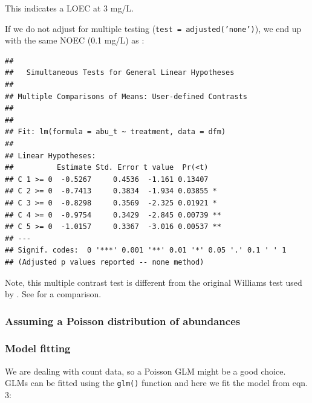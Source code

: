 This indicates a LOEC at 3 mg/L.

If we do not adjust for multiple testing (\texttt{test = adjusted('none')}), we end up with the same NOEC  (0.1 mg/L) as \citet{brock_minimum_2015}:
\begin{knitrout}
\color{fgcolor}\small\begin{kframe}
\begin{alltt}
\hlstd{(}  \hlstd{=} \hlstd{(} 
                 \hlstd{=} \hlstd{),}
                 \hlstd{=} \hlstd{(}\hlstd{))}
\end{alltt}
\begin{verbatim}
## 
## 	 Simultaneous Tests for General Linear Hypotheses
## 
## Multiple Comparisons of Means: User-defined Contrasts
## 
## 
## Fit: lm(formula = abu_t ~ treatment, data = dfm)
## 
## Linear Hypotheses:
##          Estimate Std. Error t value  Pr(<t)   
## C 1 >= 0  -0.5267     0.4536  -1.161 0.13407   
## C 2 >= 0  -0.7413     0.3834  -1.934 0.03855 * 
## C 3 >= 0  -0.8298     0.3569  -2.325 0.01921 * 
## C 4 >= 0  -0.9754     0.3429  -2.845 0.00739 **
## C 5 >= 0  -1.0157     0.3367  -3.016 0.00537 **
## ---
## Signif. codes:  0 '***' 0.001 '**' 0.01 '*' 0.05 '.' 0.1 ' ' 1
## (Adjusted p values reported -- none method)
\end{verbatim}
\end{kframe}
\end{knitrout}

Note, this multiple contrast test is different from the original Williams test \citep{williams_comparison_1972} used by \citep{brock_minimum_2015}. See \citet{bretz_powerful_1999} for a comparison.




\subsubsection{Assuming a Poisson distribution of abundances}
\subsubsection{Model fitting}
We are dealing with count data, so a Poisson GLM might be a good choice.
GLMs can be fitted using the \texttt{glm()} function and here we fit the model from eqn. 3:
\begin{knitrout}
\color{fgcolor}\small\begin{kframe}
\begin{alltt}
 \hlkwb{<-}  \hlopt{~}    
                   \hlstd{=} \hlstd{(} \hlstd{=} \hlstd{))}
\end{alltt}
\end{kframe}
\end{knitrout}

